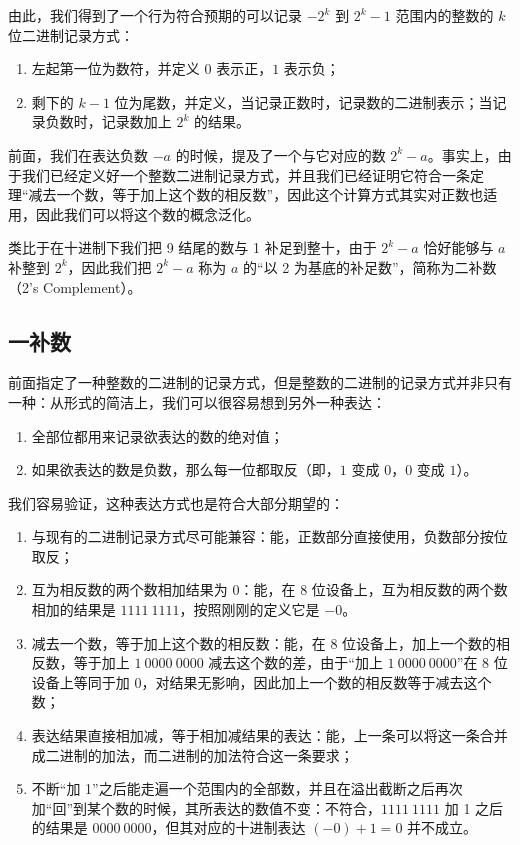         由此，我们得到了一个行为符合预期的可以记录 $-2 ^ k$ 到 $2 ^ k  -1$ 范围内的整数的 $k$ 位二进制记录方式\cite{vonneumann-1993}：
        \begin{enumerate}
            \item 左起第一位为数符，并定义 $0$ 表示正，$1$ 表示负；
            \item 剩下的 $k - 1$ 位为尾数，并定义，当记录正数时，记录数的二进制表示；当记录负数时，记录数加上 $2 ^ k$ 的结果。
        \end{enumerate}

        前面，我们在表达负数 $-a$ 的时候，提及了一个与它对应的数 $2 ^ k - a$。事实上，由于我们已经定义好一个整数二进制记录方式，并且我们已经证明它符合一条定理“减去一个数，等于加上这个数的相反数”，因此这个计算方式其实对正数也适用，因此我们可以将这个数的概念泛化。

        类比于在十进制下我们把 9 结尾的数与 1 补足到整十，由于 $2 ^ k - a$ 恰好能够与 $a$ 补整到 $2 ^ k$，因此我们把 $2 ^ k - a$ 称为 $a$ 的“以 2 为基底的补足数”，简称为二补数（2's Complement）。

    \subsection{一补数}\label{subsec:NumberSystemBasics/BinaryPresentation/OnesComplement}
        前面指定了一种整数的二进制的记录方式，但是整数的二进制的记录方式并非只有一种：从形式的简洁上，我们可以很容易想到另外一种表达：
        \begin{enumerate}
            \item 全部位都用来记录欲表达的数的绝对值；
            \item 如果欲表达的数是负数，那么每一位都取反（即，$1$ 变成 $0$，$0$ 变成 $1$）。
        \end{enumerate}

        我们容易验证，这种表达方式也是符合大部分期望的：
        \begin{enumerate}
            \item 与现有的二进制记录方式尽可能兼容：能，正数部分直接使用，负数部分按位取反；
            \item 互为相反数的两个数相加结果为 $0$：能，在 $8$ 位设备上，互为相反数的两个数相加的结果是 $1111\ 1111$，按照刚刚的定义它是 $-0$。
            \item 减去一个数，等于加上这个数的相反数：能，在 8 位设备上，加上一个数的相反数，等于加上 $1\ 0000\ 0000$ 减去这个数的差，由于“加上 $1\ 0000\ 0000$”在 8 位设备上等同于加 $0$，对结果无影响，因此加上一个数的相反数等于减去这个数；
            \item 表达结果直接相加减，等于相加减结果的表达：能，上一条可以将这一条合并成二进制的加法，而二进制的加法符合这一条要求；
            \item 不断“加 1”之后能走遍一个范围内的全部数，并且在溢出截断之后再次加“回”到某个数的时候，其所表达的数值不变：不符合，$1111\ 1111$ 加 1 之后的结果是 $0000\ 0000$，但其对应的十进制表达 $(-0) + 1 = 0$ 并不成立。
        \end{enumerate}

